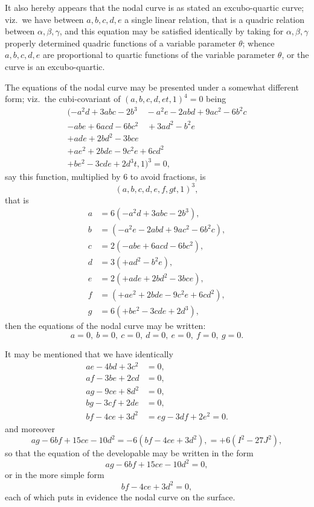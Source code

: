 \documentclass[11pt,a4paper]{article}
\theoremstyle{definition}
\begin{document}
It also hereby appears that the nodal curve is as stated an excubo-quartic curve; viz.\ we have between $a, b, c, d, e$ a single linear relation, that is a quadric relation between $\alpha, \beta, \gamma$, and this equation may be satisfied identically by taking for $\alpha, \beta, \gamma$ properly determined quadric functions of a variable parameter $\theta$; whence $a, b, c, d, e$ are proportional to quartic functions of the variable parameter $\theta$, or the curve is an excubo-quartic.

The equations of the nodal curve may be presented under a somewhat different form; viz.\ the cubi-covariant of $(a,b,c,d,e t, 1)^4 = 0$ being
\begin{multline*}
(-a^2d + 3abc - 2b^3 \quad -a^2e - 2abd + 9ac^2 - 6b^2c \\
-abe + 6acd - 6bc^2 \quad +3ad^2 - b^2e \\
+ade + 2bd^2 - 3bce \\
+ae^2 + 2bde - 9c^2e + 6cd^2 \\
+be^2 - 3cde + 2d^3  t, 1)^3 = 0,
\end{multline*}
say this function, multiplied by 6 to avoid fractions, is
\[
(a, b, c, d, e, f, g  t, 1)^3,
\]
that is
\begin{align*}
a &= 6(-a^2d + 3abc - 2b^3),\\
b &= (-a^2e - 2abd + 9ac^2 - 6b^2c),\\
c &= 2(-abe + 6acd - 6bc^2),\\
d &= 3(+ad^2 - b^2e),\\
e &= 2(+ade + 2bd^2 - 3bce),\\
f &= (+ae^2 + 2bde - 9c^2e + 6cd^2),\\
g &= 6(+be^2 - 3cde + 2d^3),
\end{align*}
then the equations of the nodal curve may be written:
\[
a = 0,\ b = 0,\ c = 0,\ d = 0,\ e = 0,\ f = 0,\ g = 0.
\]

\newpage

It may be mentioned that we have identically
\begin{align*}
ae - 4bd + 3c^2 &= 0,\\
af - 3be + 2cd &= 0,\\
ag - 9ce + 8d^2 &= 0,\\
bg - 3cf + 2de &= 0,\\
bf - 4ce + 3d^2 &= eg - 3df + 2e^2 = 0.
\end{align*}
and moreover
\[
ag - 6bf + 15ce - 10d^2 = -6(bf - 4ce + 3d^2), = +6(I^2 - 27J^2),
\]
so that the equation of the developable may be written in the form
\[
ag - 6bf + 15ce - 10d^2 = 0,
\]
or in the more simple form
\[
bf - 4ce + 3d^2 = 0,
\]
each of which puts in evidence the nodal curve on the surface.
\end{document}
